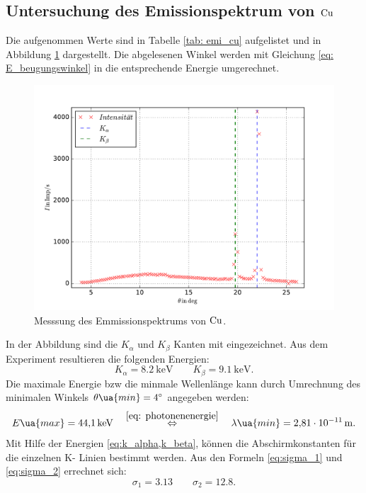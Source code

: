 \subsection{Untersuchung des Emissionspektrum von $\ce{Cu}$}
Die aufgenommen Werte sind in Tabelle \ref{tab: emi_cu} aufgelistet und in Abbildung \ref{fig: emission_cu} dargestellt.
Die abgelesenen Winkel werden mit Gleichung \eqref{eq: E_beugungswinkel} in die entsprechende Energie umgerechnet.

\begin{figure}
  \centering
  \includegraphics[width=1 \textwidth]{../Messdaten/emission_cu.pdf}
  \caption{Messsung des Emmissionspektrums von $\ce{Cu}$.} %
  \label{fig: emission_cu}
\end{figure}
In der Abbildung sind die $K_\alpha$ und $K_\beta$ Kanten mit eingezeichnet.
Aus dem Experiment resultieren die folgenden Energien:
\begin{equation}
  \label{eq:k_alpha,k_beta}
  K_\alpha=\SI{8.2}{\kilo\eV} \qquad   K_\beta=\SI{9.1}{\kilo\eV}.
\end{equation}
Die maximale Energie bzw die minmale Wellenlänge kann durch Umrechnung des minimalen
Winkels $\theta\ua{min}=\SI{4}{\degree}$ angegeben werden:
\begin{equation}
  \label{eq: maximale_energie}
  E\ua{max}=\SI{44.1}{\kilo\eV} \quad \overset{\eqref{eq: photonenenergie}}{\Leftrightarrow} \quad \lambda\ua{min}=\SI{2.81e-11}{\meter}.
\end{equation}
Mit Hilfe der Energien \eqref{eq:k_alpha,k_beta}, können die Abschirmkonstanten
für die einzelnen K- Linien bestimmt werden.
Aus den Formeln \eqref{eq:sigma_1} und \eqref{eq:sigma_2} errechnet sich:
\begin{equation}
   \label{eq:abschirm}
   \sigma_1=3.13 \qquad \sigma_2=12.8.
\end{equation}

